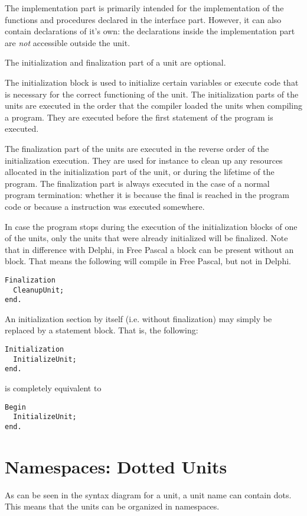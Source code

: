 The implementation part is primarily intended for the implementation of the
functions and procedures declared in the interface part. However, it can
also contain declarations of it's own: the declarations inside the 
implementation part are {\em not} accessible outside the unit. 

The initialization and finalization part of a unit are optional.

The initialization block is used to initialize certain variables or 
execute code that is necessary for the correct functioning of the unit. 
The initialization parts of the units
are executed in the order that the compiler loaded the units when compiling 
a program. They are executed before the first statement of the program is
executed.

The finalization part of the units are executed in the reverse order of the
initialization execution. They are used for instance to clean up any resources 
allocated in the initialization part  of the unit, or during the lifetime of
the program. The finalization part is always executed in the case of a
normal program termination: whether it is because the final  is
reached in the program code or because a  instruction was executed
somewhere.

In case the program stops during the execution of the initialization blocks
of one of the units, only the units that were already initialized will be
finalized.
Note that in difference with Delphi, in Free Pascal a  block can be 
present without an  block. That means the following will
compile in Free Pascal, but not in Delphi.
\begin{verbatim}
Finalization
  CleanupUnit;
end.
\end{verbatim}
An initialization section by itself (i.e. without finalization) may simply be 
replaced by a statement block. That is, the following:
\begin{verbatim}
Initialization
  InitializeUnit;
end.
\end{verbatim}
is completely equivalent to
\begin{verbatim}
Begin
  InitializeUnit;
end.
\end{verbatim}

\section{Namespaces: Dotted Units}
As can be seen in the syntax diagram for a unit, a unit name can contain dots.
This means that the units can be organized in namespaces.


